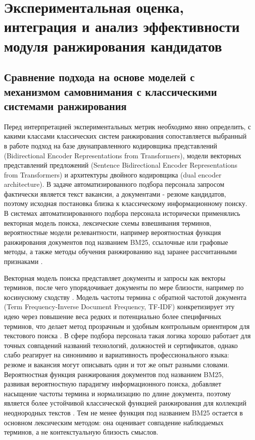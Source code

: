 \chapter{Экспериментальная оценка, интеграция и анализ эффективности модуля ранжирования кандидатов}
\label{chapter:eval}
\section{Сравнение подхода на основе моделей с механизмом самовнимания с классическими системами ранжирования}
Перед интерпретацией экспериментальных метрик необходимо явно определить, с какими классами классических систем ранжирования сопоставляется выбранный в работе подход на базе двунаправленного кодировщика представлений (Bidirectional Encoder Representations from Transformers), модели векторных представлений предложений (Sentence Bidirectional Encoder Representations from Transformers) и архитектуры двойного кодировщика (dual encoder architecture). В задаче автоматизированного подбора персонала запросом фактически является текст вакансии, а документами - резюме кандидатов, поэтому исходная постановка близка к классическому информационному поиску. В системах автоматизированного подбора персонала исторически применялись векторная модель поиска, лексические схемы взвешивания терминов, вероятностные модели релевантности, например вероятностная функция ранжирования документов под названием BM25, ссылочные или графовые методы, а также методы обучения ранжированию над заранее рассчитанными признаками \cite{src08, src11, src25}.\par
Векторная модель поиска представляет документы и запросы как векторы терминов, после чего упорядочивает документы по мере близости, например по косинусному сходству \cite{src25}. Модель частоты термина с обратной частотой документа (Term Frequency-Inverse Document Frequency, TF-IDF) конкретизирует эту идею через повышение веса редких и потенциально более специфичных терминов, что делает метод прозрачным и удобным контрольным ориентиром для текстового поиска \cite{src26}. В сфере подбора персонала такая логика хорошо работает для точных совпадений названий технологий, должностей и сертификатов, однако слабо реагирует на синонимию и вариативность профессионального языка: резюме и вакансия могут описывать один и тот же опыт разными словами. Вероятностная функция ранжирования документов под названием BM25, развивая вероятностную парадигму информационного поиска, добавляет насыщение частоты термина и нормализацию по длине документа, поэтому является более устойчивой классической функцией ранжирования для коллекций неоднородных текстов \cite{src11}. Тем не менее функция под названием BM25 остается в основном лексическим методом: она оценивает совпадение наблюдаемых терминов, а не контекстуальную близость смыслов.\par
